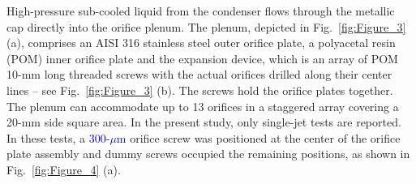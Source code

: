 \documentclass[review,preprint,12pt]{elsarticle}
\begin{document}
High-pressure sub-cooled liquid from the condenser flows through the metallic cap directly into the orifice plenum. The plenum, depicted in Fig.~\ref{fig:Figure_3} (a), comprises an AISI 316 stainless steel outer orifice plate, a polyacetal resin (POM) inner orifice plate and the expansion device, which is an array of POM 10-mm long threaded screws with the actual orifices drilled along their center lines -- see Fig.~\ref{fig:Figure_3} (b). The screws hold the orifice plates together. The plenum can accommodate up to 13 orifices in a staggered array covering a 20-mm side square area. %
In the present study, only single-jet tests are reported. In these tests, a \textcolor{blue}{300-$\mu$m} orifice screw was positioned at the center of the orifice plate assembly and dummy screws occupied the remaining positions, as shown in Fig.~\ref{fig:Figure_4} (a). 


%
\end{document}
